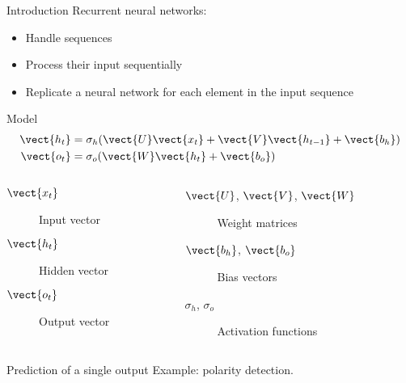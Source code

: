 \begin{frame}{Introduction}
  Recurrent neural networks:

  \begin{itemize}[<+(1)->]
    \item Handle sequences
    \item Process their input sequentially
    \item Replicate a neural network for each element in the input sequence
  \end{itemize}
\end{frame}

\begin{frame}{Model}
  \vspace{-2ex}
  \begin{align*}
    \vect{h_t} &= \sigma_h(\vect{U} \vect{x_t} + \vect{V} \vect{h_{t-1}} + \vect{b_h}) \\
    \vect{o_t} &= \sigma_o(\vect{W} \vect{h_t} + \vect{b_o})
  \end{align*}
  \vspace{-2ex}
  \begin{columns}
    \begin{column}{.5\textwidth}
      \begin{description}
        \item[$\vect{x_t}$] Input vector
        \item[$\vect{h_t}$] Hidden vector
        \item[$\vect{o_t}$] Output vector
        \end{description}
    \end{column}
    \begin{column}{.5\textwidth}
      \begin{description}
        \item[$\vect{U}$, $\vect{V}$, $\vect{W}$] Weight matrices
        \item[$\vect{b_h}$, $\vect{b_o}$] Bias vectors
        \item[$\sigma_h$, $\sigma_o$] Activation functions
        \end{description}
    \end{column}
  \end{columns}
\end{frame}

\begin{frame}{Prediction of a single output}
  Example: polarity detection.

  \begin{figure}
    \centering
  \end{figure}
\end{frame}


